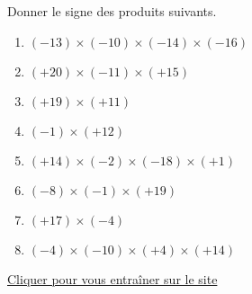 \begin{exercice*}
    Donner le signe des produits suivants.
        \begin{enumerate}
            \item $ (-13) \times (-10) \times (-14) \times (-16) $
            \item $ (+20) \times (-11) \times (+15) $
            \item $ (+19) \times (+11) $
            \item $ (-1) \times (+12) $
            \item $ (+14) \times (-2) \times (-18) \times (+1) $
            \item $ (-8) \times (-1) \times (+19) $
            \item $ (+17) \times (-4) $
            \item $ (-4) \times (-10) \times (+4) \times (+14) $
        \end{enumerate}

    \href{https://coopmaths.fr/mathalea.html?ex=4C10-1,s=1,n=8,i=1&v=l}{Cliquer pour vous entraîner sur le site \mathaleaLogo} 
\end{exercice*}
